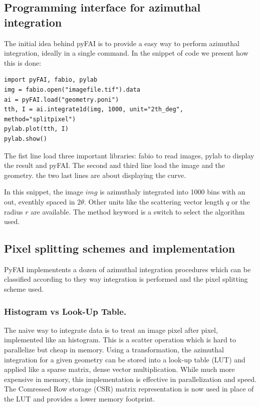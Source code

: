 \documentclass[preprint]{iucr}
\begin{document}
\subsection{Programming interface for azimuthal integration}

The initial idea behind pyFAI is to provide a easy way to perform azimuthal
integration, ideally in a single command. In the snippet of code we present how
this is done:

\begin{verbatim}
import pyFAI, fabio, pylab
img = fabio.open("imagefile.tif").data
ai = pyFAI.load("geometry.poni")
tth, I = ai.integrate1d(img, 1000, unit="2th_deg", method="splitpixel")
pylab.plot(tth, I)
pylab.show()
\end{verbatim}

The fist line load three important libraries: fabio \cite{fabio} to read
images, pylab \cite{matplotlib} to display the result and pyFAI.
The second and third line load the image and the geometry.
the two last lines are about displaying the curve.

In this snippet, the image $img$ is azimuthaly integrated into 1000 bins with an
out, eventhly spaced in $2\theta$. Other units like the scattering vector length
$q$ or the radius $r$ are available.
The method keyword is a switch to select the algorithm used.

\subsection{Pixel splitting schemes and implementation}

PyFAI implementents a dozen of azimuthal integration procedures which can be
classified according to they way integration is performed and the pixel
splitting scheme used.

\subsubsection{Histogram vs Look-Up Table.} 
The naive way to integrate data is to treat an image pixel after pixel, 
implemented like an histogram. This is a scatter operation which is hard to
parallelize but cheap in memory.
Using a  transformation, the azimuthal integration for
a given geometry can be stored into a look-up table (LUT) and applied like a
sparse matrix, dense vector multiplication. 
While much more expensive in memory, this
implementation is effective in parallelization and speed. 
The Comressed Row storage (CSR) matrix representation is now used in place of
the LUT and provides a lower memory footprint.
\end{document}
